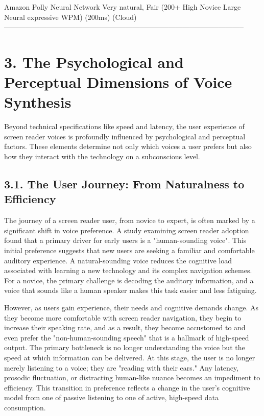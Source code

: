   Amazon Polly  Neural Network         Very natural, Fair (200+  High          Novice     Large
  Neural                               expressive    WPM)        (\>200ms)                (Cloud)
  -----------------------------------------------------------------------------------------------------

\section{3. The Psychological and Perceptual Dimensions of Voice Synthesis}
Beyond technical specifications like speed and latency, the user
experience of screen reader voices is profoundly influenced by
psychological and perceptual factors. These elements determine not only
which voices a user prefers but also how they interact with the
technology on a subconscious level.

\subsection{3.1. The User Journey: From Naturalness to Efficiency}
The journey of a screen reader user, from novice to expert, is often
marked by a significant shift in voice preference. A study examining
screen reader adoption found that a primary driver for early users is a
"human-sounding voice".\supercite{19} This initial preference suggests that new
users are seeking a familiar and comfortable auditory experience. A
natural-sounding voice reduces the cognitive load associated with
learning a new technology and its complex navigation schemes. For a
novice, the primary challenge is decoding the auditory information, and
a voice that sounds like a human speaker makes this task easier and less
fatiguing.

However, as users gain experience, their needs and cognitive demands
change. As they become more comfortable with screen reader navigation,
they begin to increase their speaking rate, and as a result, they become
accustomed to and even prefer the "non-human-sounding speech" that is
a hallmark of high-speed output.\supercite{19} The primary bottleneck is no longer
understanding the voice but the speed at which information can be
delivered. At this stage, the user is no longer merely listening to a
voice; they are "reading with their ears." Any latency, prosodic
fluctuation, or distracting human-like nuance becomes an impediment to
efficiency. This transition in preference reflects a change in the
user's cognitive model from one of passive listening to one of active,
high-speed data consumption.

